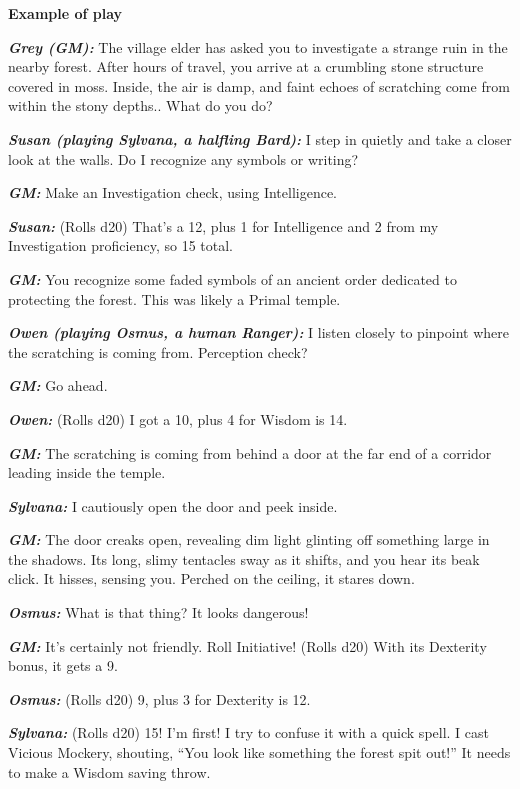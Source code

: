 \textbf{Example of play}

\textbf{\emph{Grey (GM):}} The village elder has asked you to
investigate a strange ruin in the nearby forest. After hours of travel,
you arrive at a crumbling stone structure covered in moss. Inside, the
air is damp, and faint echoes of scratching come from within the stony
depths.. What do you do?

\textbf{\emph{Susan (playing Sylvana, a halfling Bard):}} I step in
quietly and take a closer look at the walls. Do I recognize any symbols
or writing?

\textbf{\emph{GM:}} Make an Investigation check, using Intelligence.

\textbf{\emph{Susan:}} (Rolls d20) That's a 12, plus 1 for Intelligence
and 2 from my Investigation proficiency, so 15 total.

\textbf{\emph{GM:}} You recognize some faded symbols of an ancient order
dedicated to protecting the forest. This was likely a Primal temple.

\textbf{\emph{Owen (playing Osmus, a human Ranger):}} I listen closely
to pinpoint where the scratching is coming from. Perception check?

\textbf{\emph{GM:}} Go ahead.

\textbf{\emph{Owen:}} (Rolls d20) I got a 10, plus 4 for Wisdom is 14.

\textbf{\emph{GM:}} The scratching is coming from behind a door at the
far end of a corridor leading inside the temple.

\textbf{\emph{Sylvana:}} I cautiously open the door and peek inside.

\textbf{\emph{GM:}} The door creaks open, revealing dim light glinting
off something large in the shadows. Its long, slimy tentacles sway as it
shifts, and you hear its beak click. It hisses, sensing you. Perched on
the ceiling, it stares down.

\textbf{\emph{Osmus:}} What is that thing? It looks dangerous!

\textbf{\emph{GM:}} It's certainly not friendly. Roll Initiative! (Rolls
d20) With its Dexterity bonus, it gets a 9.

\textbf{\emph{Osmus:}} (Rolls d20) 9, plus 3 for Dexterity is 12.

\textbf{\emph{Sylvana:}} (Rolls d20) 15! I'm first! I try to confuse it
with a quick spell. I cast Vicious Mockery, shouting, ``You look like
something the forest spit out!'' It needs to make a Wisdom saving throw.

